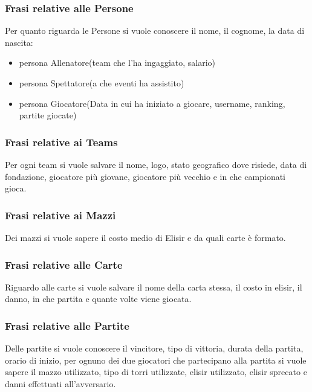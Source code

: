 \documentclass{article}
\begin{document}
\subsubsection{Frasi relative alle Persone}

Per quanto riguarda le Persone si vuole conoscere il nome, il cognome, la data di nascita:
\begin{itemize}
    \item persona Allenatore(team che l'ha ingaggiato, salario)
    \item persona Spettatore(a che eventi ha assistito)
    \item persona Giocatore(Data in cui ha iniziato a giocare, username, ranking, partite giocate)
\end{itemize}

\subsubsection{Frasi relative ai Teams}

Per ogni team si vuole salvare il nome, logo, stato geografico dove risiede, data di fondazione, giocatore più giovane, giocatore più vecchio e in che campionati gioca.

\subsubsection{Frasi relative ai Mazzi}

Dei mazzi si vuole sapere il costo medio di Elisir e da quali carte è formato.

\subsubsection{Frasi relative alle Carte}

Riguardo alle carte si vuole salvare il nome della carta stessa, il costo in elisir, il danno, in che partita e quante volte viene giocata.

\subsubsection{Frasi relative alle Partite}

Delle partite si vuole conoscere il vincitore, tipo di vittoria, durata della partita, orario di inizio, per ognuno dei due giocatori che partecipano alla partita si vuole sapere il mazzo utilizzato, tipo di torri utilizzate, elisir utilizzato, elisir sprecato e danni effettuati all'avversario.
\end{document}

